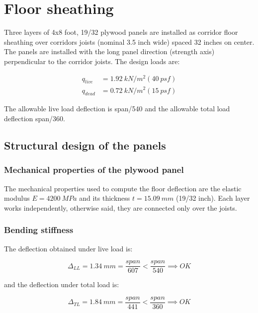 \documentclass[a4paper,11pt]{xc_memo}
\begin{document}
\maketitle

\section{Floor sheathing}
Three layers of 4x8 foot, 19/32 plywood panels are installed as corridor floor sheathing over corridors joists (nominal 3.5 inch wide) spaced 32 inches on center. The panels are installed with the long panel direction (strength axis) perpendicular to the corridor joists. The design loads are:

\begin{align}
  q_{live}&= 1.92\ kN/m^2 (40\ psf) \\
  q_{dead}&= 0.72\ kN/m^2 (15\ psf)
\end{align}

The allowable live load deflection is span/540 and the allowable total load deflection span/360.

\subsection{Structural design of the panels}

\subsubsection{Mechanical properties of the plywood panel}
The mechanical properties used to compute the floor deflection are the elastic modulus $E= 4200\ MPa$ and its thickness $t= 15.09\ mm$ (19/32 inch). Each layer works independently, otherwise said, they are connected only over the joists. 


\subsubsection{Bending stiffness}
The deflection obtained under live load is:

\begin{equation}
  \Delta_{LL}= 1.34\ mm= \frac{span}{607} < \frac{span}{540} \implies OK
\end{equation}

\noindent and the deflection under total load is:

\begin{equation}
  \Delta_{TL}= 1.84\ mm= \frac{span}{441} < \frac{span}{360} \implies OK
\end{equation}
\end{document}
